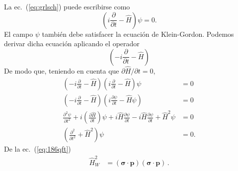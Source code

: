 \begin{frame}
La ec.~(\ref{eq:grlsch}) puede escribirse como
\begin{equation}
  \left(i\frac{\partial}{\partial t}-\hat{H}\right)\psi=0.
\end{equation}
El campo $\psi$ también debe satisfacer la ecuación de Klein-Gordon. Podemos derivar dicha ecuación aplicando el operador
\begin{equation*}
  \left(-i\frac{\partial}{\partial t}-\hat{H}\right)
\end{equation*}
De modo que, teniendo en cuenta que $\partial\hat H/\partial t=0$,
\begin{align}
  \label{eq:2qftw}
 \left(-i\frac{\partial}{\partial t}-\hat{H}\right)\left(i\frac{\partial}{\partial t}-\hat{H}\right)\psi&=0\nonumber\\
 \left(-i\frac{\partial}{\partial t}-\hat{H}\right)\left(i\frac{\partial\psi}{\partial t}-\hat{H}\psi\right)&=0\nonumber\\
 \frac{\partial^2\psi}{\partial t^2}+i\left(\frac{\partial\hat{H}}{\partial t}\right)\psi
 +i\hat{H}\frac{\partial\psi}{\partial t}-i\hat{H}\frac{\partial\psi}{\partial t}+\hat{H}^2\psi&=0\nonumber\\
 \left(\frac{\partial^2}{\partial t^2}+\hat{H}^2\right)\psi&=0.
\end{align}
% 
De la ec.~(\ref{eq:186qft})
\begin{align}
\label{eq:106qft}
\hat{H}^2_W&=(\boldsymbol\sigma\cdot\mathbf{p})(\boldsymbol\sigma\cdot\mathbf{p})\,.
\end{align}
\end{frame}

